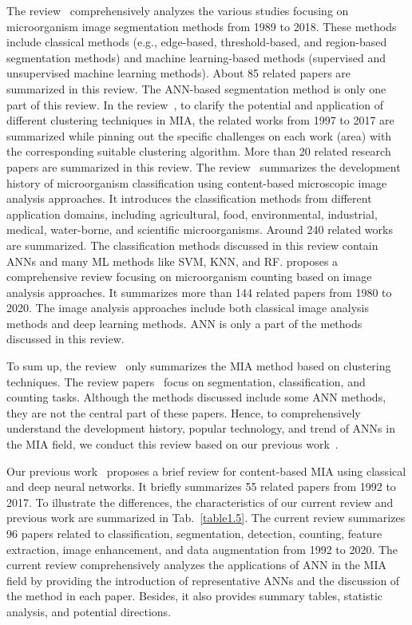 The review~\cite{Kulwa-2019-ASSM} comprehensively analyzes the various studies focusing on microorganism image segmentation methods from 1989 to 2018. These methods include classical methods (e.g., edge-based, threshold-based, and region-based segmentation methods) and machine learning-based methods (supervised and unsupervised machine learning methods). About 85 related papers are summarized in this review. The ANN-based segmentation method is only one part of this review. In the review~\cite{Li-2020-ARCM}, to clarify the potential and application of different clustering techniques in MIA, the related works from 1997 to 2017 are summarized while pinning out the specific challenges on each work (area) with the corresponding suitable clustering algorithm. More than 20 related research papers are summarized in this review. The review~\cite{Li-2019-ASAC} summarizes the development history of microorganism classification using content-based microscopic image analysis approaches. It introduces the classification methods from different application domains, including agricultural, food, environmental, industrial, medical, water-borne, and scientific microorganisms. Around 240 related works are summarized. The classification methods discussed in this review contain ANNs and many ML methods like SVM, KNN, and RF. \cite{Zhang-2021-ACRI} proposes a comprehensive review focusing on microorganism counting based on image analysis approaches. It summarizes more than 144 related papers from 1980 to 2020. The image analysis approaches include both classical image analysis methods and deep learning methods. ANN is only a part of the methods discussed in this review.


To sum up, the review~\cite{Li-2020-ARCM} only summarizes the MIA method based on clustering techniques. The review papers~\cite{Kulwa-2019-ASSM,Li-2019-ASAC,Zhang-2021-ACRI} focus on segmentation, classification, and counting tasks. Although the methods discussed include some ANN methods, they are not the central part of these papers. Hence, to comprehensively understand the development history, popular technology, and trend of ANNs in the MIA field, we conduct this review based on our previous work~\cite{Li-2018-ABRC}.

Our previous work~\cite{Li-2018-ABRC} proposes a brief review for content-based MIA using classical and deep neural networks. It briefly summarizes 55 related papers from 1992 to 2017. To illustrate the differences, the characteristics of our current review and previous work are summarized in Tab.~\ref{table1.5}. The current review summarizes 96 papers related to classification, segmentation, detection, counting, feature extraction, image enhancement, and data augmentation from 1992 to 2020. The current review comprehensively analyzes the applications of ANN in the MIA field by providing the introduction of representative ANNs and the discussion of the method in each paper. Besides, it also provides summary tables, statistic analysis, and potential directions.

